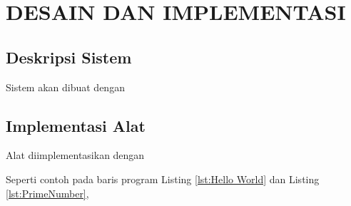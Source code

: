 \chapter{DESAIN DAN IMPLEMENTASI}


\section{Deskripsi Sistem}

Sistem akan dibuat dengan \lipsum[21][1-12]

\section{Implementasi Alat}

Alat diimplementasikan dengan \lipsum[22]

Seperti contoh pada baris program Listing \ref{lst:Hello World} dan Listing \ref{lst:PrimeNumber}, \lipsum[23]


